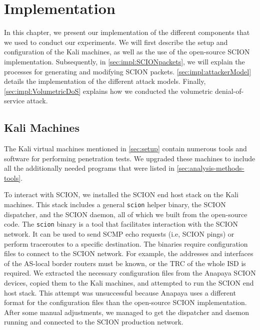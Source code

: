 \chapter{Implementation}
\label{ch:implementation}


In this chapter, we present our implementation of the different components that we used to conduct our experiments.
We will first describe the setup and configuration of the Kali machines, as well as the use of the open-source SCION implementation.
Subsequently, in \cref{sec:impl:SCIONpackets}, we will explain the processes for generating and modifying SCION packets.
\cref{sec:impl:attackerModel} details the implementation of the different attack models.
Finally, \cref{sec:impl:VolumetricDoS} explains how we conducted the volumetric denial-of-service attack.

\section{Kali Machines}

The Kali virtual machines mentioned in \cref{sec:setup} contain numerous tools and software for performing penetration tests.
We upgraded these machines to include all the additionally needed programs that were listed in \cref{sec:analysis-methods-tools}.

To interact with SCION, we installed the SCION end host stack on the Kali machines.
This stack includes a general \texttt{scion} helper binary, the SCION dispatcher, and the SCION daemon, all of which we built from the open-source code.
The \texttt{scion} binary is a tool that facilitates interaction with the SCION network.
It can be used to send SCMP echo requests (i.e, SCION pings) or perform traceroutes to a specific destination.
The binaries require configuration files to connect to the SCION network.
For example, the addresses and interfaces of the AS-local border routers must be known, or the TRC of the whole ISD is required.
We extracted the necessary configuration files from the Anapaya SCION devices, copied them to the Kali machines, and attempted to run the SCION end host stack.
This attempt was unsuccessful because Anapaya uses a different format for the configuration files than the open-source SCION implementation.
After some manual adjustments, we managed to get the dispatcher and daemon running and connected to the SCION production network.

